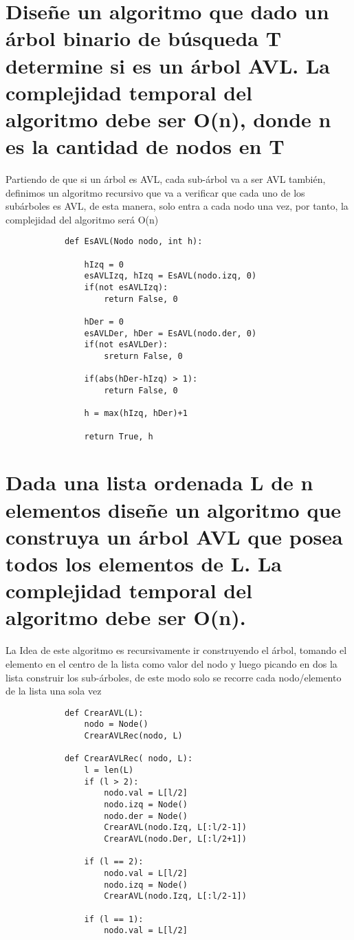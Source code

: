 \documentclass[10pt,a4paper]{article}
\begin{document}
        \section{ Diseñe un algoritmo que dado un árbol binario de búsqueda T determine si es un árbol AVL. La complejidad
        temporal del algoritmo debe ser O(n), donde n es la cantidad de nodos en T }
        Partiendo de que si un árbol es AVL, cada sub-árbol va a ser AVL también, definimos un algoritmo recursivo
        que va a verificar que cada uno de los subárboles es AVL, de esta manera, solo entra a cada nodo una vez,
        por tanto, la complejidad del algoritmo será O(n)
        \begin{lstlisting}
            def EsAVL(Nodo nodo, int h):

                hIzq = 0                            
                esAVLIzq, hIzq = EsAVL(nodo.izq, 0) 
                if(not esAVLIzq):                   
                    return False, 0                     
                
                hDer = 0                            
                esAVLDer, hDer = EsAVL(nodo.der, 0) 
                if(not esAVLDer):                   
                    sreturn False, 0

                if(abs(hDer-hIzq) > 1):             
                    return False, 0

                h = max(hIzq, hDer)+1               

                return True, h                      
        \end{lstlisting}
        \section{Dada una lista ordenada L de n elementos diseñe un algoritmo que construya un árbol AVL que posea todos
        los elementos de L. La complejidad temporal del algoritmo debe ser O(n).
        }
        La Idea de este algoritmo es recursivamente ir construyendo el árbol, tomando el elemento en el centro de la lista
        como valor del nodo y luego picando en dos la lista construir los sub-árboles, de este modo solo se recorre cada 
        nodo/elemento de la lista una sola vez
        \begin{lstlisting}
            def CrearAVL(L):
                nodo = Node()
                CrearAVLRec(nodo, L)

            def CrearAVLRec( nodo, L):
                l = len(L)
                if (l > 2):
                    nodo.val = L[l/2]
                    nodo.izq = Node()
                    nodo.der = Node()
                    CrearAVL(nodo.Izq, L[:l/2-1])
                    CrearAVL(nodo.Der, L[:l/2+1])
                
                if (l == 2):
                    nodo.val = L[l/2]
                    nodo.izq = Node()
                    CrearAVL(nodo.Izq, L[:l/2-1])
                
                if (l == 1):
                    nodo.val = L[l/2]

        \end{lstlisting}
\end{document}
